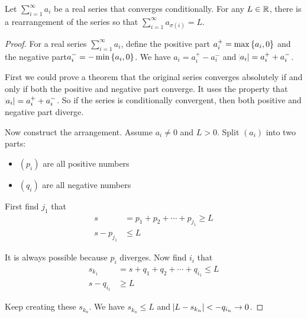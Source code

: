 \begin{theorem}
    Let $\sum_{i=1}^\infty a_i$ be a real series that converges conditionally. For any $L \in \mathbb{R}$, there is a rearrangement of the series so that $\sum_{i=1}^\infty a_{\sigma (i)} = L$.
\end{theorem}
\begin{proof}
    For a real series $\sum_{i=1}^\infty a_i$, define the positive part $a^{+}_i = \max \set{a_i, 0}$ and the negative part$a_i^{-} = - \min \set{a_i, 0}$. We have $a_i = a_i^{+} - a_i^{-}$ and $\abs{a_i} = a_i^{+} + a_i^{-}$. 
    
    First we could prove a theorem that the original series converges absolutely if and only if both the positive and negative part converge. It uses the property that $\abs{a_i} = a_i^{+} + a_i^{-}$. So if the series is conditionally convergent, then both positive and negative part diverge.

    Now construct the arrangement. Assume $a_i \neq 0$ and $L > 0$. Split $(a_i)$ into two parts:
    \begin{itemize}
        \item $(p_i)$ are all positive numbers
        \item $(q_i)$ are all negative numbers
    \end{itemize}
    
    First find $j_1$ that
    \begin{equation*}
        \begin{aligned}
            s &= p_1 + p_2 + \cdots + p_{j_1} \geq L \\
            s - p_{j_1} &\leq L
        \end{aligned}
    \end{equation*}
    
    It is always possible because $p_i$ diverges. Now find $i_i$ that
    \begin{equation*}
        \begin{aligned}
            s_{k_1} &= s + q_1 + q_2 + \cdots + q_{i_1} \leq L \\
            s - q_{i_1} &\geq L
        \end{aligned}
    \end{equation*}
    
    Keep creating these $s_{k_n}$. We have $s_{k_n} \leq L$ and $\abs{L - s_{k_n}} < - q_{i_n} \rightarrow 0$.
\end{proof}
